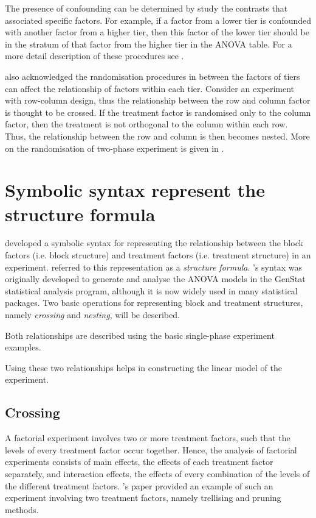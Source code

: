 \documentclass[11pt,a4paper]{article}
\begin{document}
The presence of confounding can be determined by study the contrasts that associated specific factors. For example, if a factor from a lower tier is confounded with another factor from a higher tier, then this factor of the lower tier should be in the stratum of that factor from the higher tier in the ANOVA table. For a more detail description of these procedures see \cite{Brien1983}.

\cite{Brien1983} also acknowledged the randomisation procedures in between the factors of tiers can affect the relationship of factors within each tier. Consider an experiment with row-column design, thus the relationship between the row and column factor is thought to be crossed.  If the treatment factor is randomised only to the column factor, then the treatment is not orthogonal to the column within each row. Thus, the relationship between the row and column is then becomes nested. More on the randomisation of two-phase experiment is given in \cite{Brien2006b}.

\section{Symbolic syntax represent the structure formula}
\cite{Wilkinson1973} developed a symbolic syntax for representing the relationship between the block factors (i.e. block structure) and treatment factors (i.e. treatment structure) in an experiment. \cite{Brien1999} referred to this representation as a \emph{structure formula}. \citeauthor{Wilkinson1973}'s syntax was originally developed to generate and analyse the ANOVA models in the GenStat statistical analysis program, although it is now widely used in many statistical packages. Two basic operations for representing block and treatment structures, namely \emph{crossing} and \emph{nesting}, will be described. 

Both relationships are described using the basic single-phase experiment examples.

Using these two relationships helps in constructing the linear model of the experiment.  

\subsection{Crossing}\label{subsec:cross}
A factorial experiment involves two or more treatment factors, such that the levels of every treatment factor occur together. Hence, the analysis of factorial experiments consists of main effects, the effects of each treatment factor separately, and interaction effects, the effects of every combination of the levels of the different treatment factors. \citeauthor{Brien1999}'s paper provided an example of such an experiment involving two treatment factors, namely trellising and pruning methods.
\end{document}
